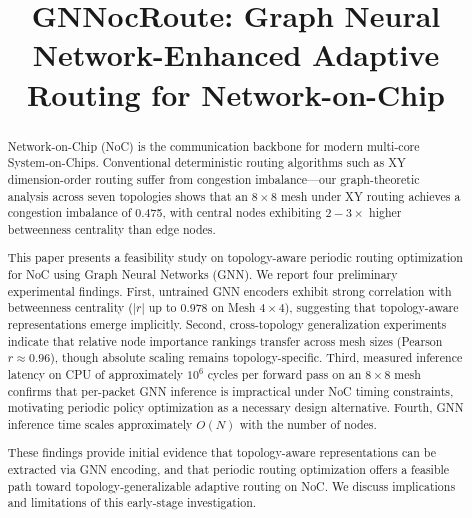 \documentclass[conference]{IEEEtran}
\begin{document}
\title{GNNocRoute: Graph Neural Network-Enhanced Adaptive Routing for Network-on-Chip}

\author{
}

\maketitle

\begin{abstract}
Network-on-Chip (NoC) is the communication backbone for modern multi-core System-on-Chips. Conventional deterministic routing algorithms such as XY dimension-order routing suffer from congestion imbalance---our graph-theoretic analysis across seven topologies shows that an $8\times8$ mesh under XY routing achieves a congestion imbalance of 0.475, with central nodes exhibiting $2-3\times$ higher betweenness centrality than edge nodes.

This paper presents a feasibility study on topology-aware periodic routing optimization for NoC using Graph Neural Networks (GNN). We report four preliminary experimental findings. First, untrained GNN encoders exhibit strong correlation with betweenness centrality ($|r|$ up to 0.978 on Mesh $4\times4$), suggesting that topology-aware representations emerge implicitly. Second, cross-topology generalization experiments indicate that relative node importance rankings transfer across mesh sizes (Pearson $r \approx 0.96$), though absolute scaling remains topology-specific. Third, measured inference latency on CPU of approximately $10^6$ cycles per forward pass on an $8\times8$ mesh confirms that per-packet GNN inference is impractical under NoC timing constraints, motivating periodic policy optimization as a necessary design alternative. Fourth, GNN inference time scales approximately $O(N)$ with the number of nodes.

These findings provide initial evidence that topology-aware representations can be extracted via GNN encoding, and that periodic routing optimization offers a feasible path toward topology-generalizable adaptive routing on NoC. We discuss implications and limitations of this early-stage investigation.
\end{abstract}
\end{document}
